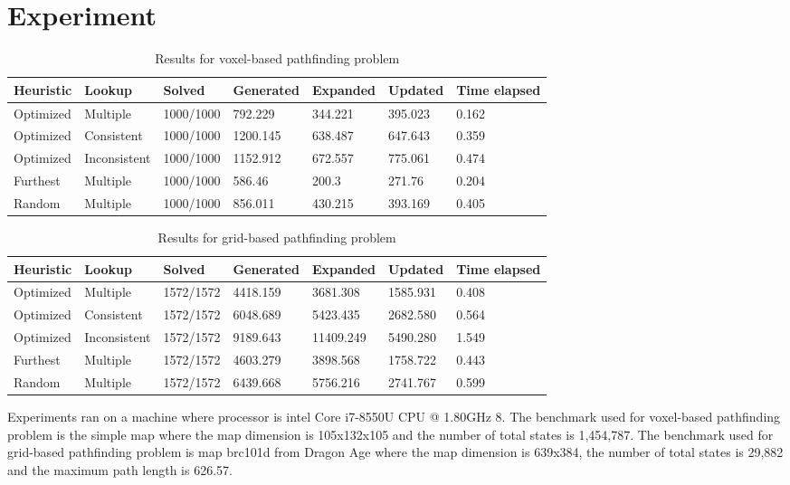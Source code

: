 \documentclass[twocolumn]{article}
\begin{document}
\section{Experiment}
\begin{table*}[!bhtpH]
\caption{Results for voxel-based pathfinding problem}
\begin{tabular}{|l|l|l|l|l|l|l|}
\hline
Heuristic & Lookup & Solved & Generated & Expanded & Updated & Time elapsed \\ \hline
Optimized & Multiple & 1000/1000 & 792.229 & 344.221 & 395.023 & 0.162 \\ \hline
Optimized & Consistent & 1000/1000 & 1200.145 & 638.487 & 647.643 & 0.359 \\ \hline
Optimized & Inconsistent & 1000/1000 & 1152.912 & 672.557 & 775.061 & 0.474 \\ \hline
Furthest & Multiple & 1000/1000 & 586.46 & 200.3 & 271.76 & 0.204 \\ \hline
Random & Multiple & 1000/1000 & 856.011 & 430.215 & 393.169 & 0.405 \\ \hline
\end{tabular}
\end{table*}

\begin{table*}[!bhtpH]
\caption{Results for grid-based pathfinding problem}
\begin{tabular}{|l|l|l|l|l|l|l|}
\hline
Heuristic & Lookup & Solved & Generated & Expanded & Updated & Time elapsed \\ \hline
Optimized & Multiple & 1572/1572 & 4418.159 & 3681.308 & 1585.931 & 0.408 \\ \hline
Optimized & Consistent & 1572/1572 & 6048.689 & 5423.435 & 2682.580 & 0.564 \\ \hline
Optimized & Inconsistent & 1572/1572 & 9189.643 & 11409.249 & 5490.280 & 1.549 \\ \hline
Furthest & Multiple & 1572/1572 & 4603.279 & 3898.568 & 1758.722 & 0.443 \\ \hline
Random & Multiple & 1572/1572 & 6439.668 & 5756.216 & 2741.767 & 0.599 \\ \hline
\end{tabular}
\end{table*}

Experiments ran on a machine where processor is intel Core i7-8550U CPU @ 1.80GHz 8. The benchmark used for voxel-based pathfinding problem is the simple map where the map dimension is 105x132x105 and the number of total states is 1,454,787. The benchmark used for grid-based pathfinding problem is map brc101d from Dragon Age where the map dimension is 639x384, the number of total states is 29,882 and the maximum path length is 626.57. 
\end{document}

